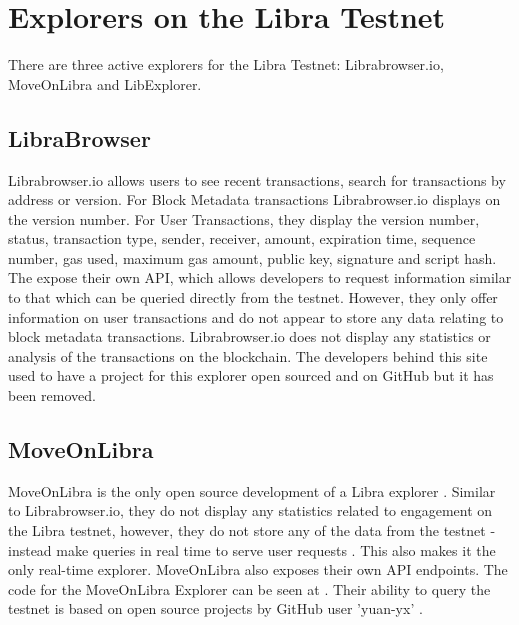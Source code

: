 \documentclass[12pt,openany,a4paper]{book}
\begin{document}
\section{Explorers on the Libra Testnet}
\label{__related_works:libra}
There are three active explorers for the Libra Testnet: Librabrowser.io, MoveOnLibra and LibExplorer.

\subsection{LibraBrowser}
Librabrowser.io \cite{librabrowser} allows users 
to see recent transactions, search for transactions by address or version. For Block Metadata 
transactions Librabrowser.io displays on the version number. For User Transactions,
they display the version number, status, transaction type, sender, receiver, amount, expiration time,
sequence number, gas used, maximum gas amount, public key, signature and script hash.
The expose their own API, which allows developers to request information similar to that
which can be queried directly from the testnet. However, they only offer information on user transactions
and do not appear to store any data relating to block metadata transactions. 
Librabrowser.io does not display any statistics or analysis of the transactions 
on the blockchain.
The developers behind this site used to have a project for this explorer open sourced
and on GitHub but it has been removed.


\subsection{MoveOnLibra}
MoveOnLibra is the only open source development of a Libra explorer \cite{mol}. Similar to Librabrowser.io,
they do not display any statistics related to engagement on the Libra testnet, however, they do not 
store any of the data from the testnet - instead make queries in real time to serve 
user requests \cite{mol_explorer}. This also makes it the only real-time explorer.
MoveOnLibra also exposes their own API endpoints.
The code for the MoveOnLibra Explorer can be seen at \cite{mol_explorer}. Their 
ability to query the testnet is based on open source projects by GitHub user 
'yuan-yx' \cite{yuan_libra_client, yuan_libra_grpc}.
\end{document}
